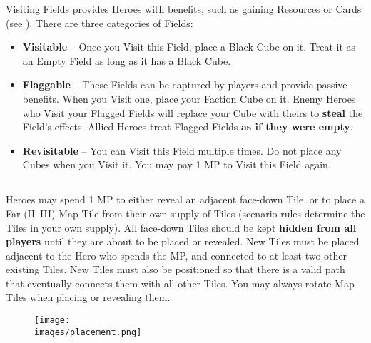 \begin{multicols}{2}

Visiting Fields provides Heroes with benefits, such as gaining Resources or Cards (see ).
There are three categories of Fields:
\begin{itemize}
  \item \textbf{Visitable} – Once you Visit this Field, place a Black Cube on it.
    Treat it as an Empty Field as long as it has a Black Cube.
  \item \textbf{Flaggable} – These Fields can be captured by players and provide passive benefits.
    When you Visit one, place your Faction Cube on it.
    Enemy Heroes who Visit your Flagged Fields will replace your Cube with theirs to \textbf{steal} the Field’s effects.
    Allied Heroes treat Flagged Fields \textbf{as if they were empty}.
  \item \textbf{Revisitable} – You can Visit this Field multiple times.
    Do not place any Cubes when you Visit it.
    You may pay 1 MP to Visit this Field again.
\end{itemize}

\subsection*{}
Heroes may spend 1 MP to either reveal an adjacent face-down Tile, or to place a Far (II–III) Map Tile from their own supply of Tiles (scenario rules determine the Tiles in your own supply).
All face-down Tiles should be kept \textbf{hidden from all players} until they are about to be placed or revealed.
New Tiles must be placed adjacent to the Hero who spends the MP, and connected to at least two other existing Tiles.
New Tiles must also be positioned so that there is a valid path that eventually connects them with all other Tiles.
You may always rotate Map Tiles when placing or revealing them.

\medskip
{}

\end{multicols}

\vspace*{-1em}
\begin{figure*}[!hb]
  \centering
  \texttt{[image: \\images/placement.png]}
\end{figure*}

